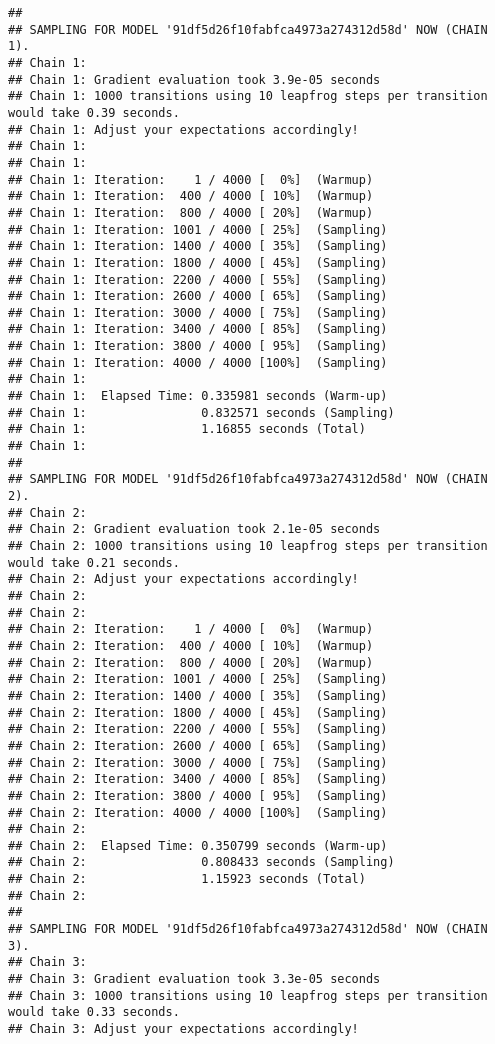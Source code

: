 \documentclass[12pt,]{article}
\begin{document}
{\begin{verbatim}
## 
## SAMPLING FOR MODEL '91df5d26f10fabfca4973a274312d58d' NOW (CHAIN 1).
## Chain 1: 
## Chain 1: Gradient evaluation took 3.9e-05 seconds
## Chain 1: 1000 transitions using 10 leapfrog steps per transition would take 0.39 seconds.
## Chain 1: Adjust your expectations accordingly!
## Chain 1: 
## Chain 1: 
## Chain 1: Iteration:    1 / 4000 [  0%]  (Warmup)
## Chain 1: Iteration:  400 / 4000 [ 10%]  (Warmup)
## Chain 1: Iteration:  800 / 4000 [ 20%]  (Warmup)
## Chain 1: Iteration: 1001 / 4000 [ 25%]  (Sampling)
## Chain 1: Iteration: 1400 / 4000 [ 35%]  (Sampling)
## Chain 1: Iteration: 1800 / 4000 [ 45%]  (Sampling)
## Chain 1: Iteration: 2200 / 4000 [ 55%]  (Sampling)
## Chain 1: Iteration: 2600 / 4000 [ 65%]  (Sampling)
## Chain 1: Iteration: 3000 / 4000 [ 75%]  (Sampling)
## Chain 1: Iteration: 3400 / 4000 [ 85%]  (Sampling)
## Chain 1: Iteration: 3800 / 4000 [ 95%]  (Sampling)
## Chain 1: Iteration: 4000 / 4000 [100%]  (Sampling)
## Chain 1: 
## Chain 1:  Elapsed Time: 0.335981 seconds (Warm-up)
## Chain 1:                0.832571 seconds (Sampling)
## Chain 1:                1.16855 seconds (Total)
## Chain 1: 
## 
## SAMPLING FOR MODEL '91df5d26f10fabfca4973a274312d58d' NOW (CHAIN 2).
## Chain 2: 
## Chain 2: Gradient evaluation took 2.1e-05 seconds
## Chain 2: 1000 transitions using 10 leapfrog steps per transition would take 0.21 seconds.
## Chain 2: Adjust your expectations accordingly!
## Chain 2: 
## Chain 2: 
## Chain 2: Iteration:    1 / 4000 [  0%]  (Warmup)
## Chain 2: Iteration:  400 / 4000 [ 10%]  (Warmup)
## Chain 2: Iteration:  800 / 4000 [ 20%]  (Warmup)
## Chain 2: Iteration: 1001 / 4000 [ 25%]  (Sampling)
## Chain 2: Iteration: 1400 / 4000 [ 35%]  (Sampling)
## Chain 2: Iteration: 1800 / 4000 [ 45%]  (Sampling)
## Chain 2: Iteration: 2200 / 4000 [ 55%]  (Sampling)
## Chain 2: Iteration: 2600 / 4000 [ 65%]  (Sampling)
## Chain 2: Iteration: 3000 / 4000 [ 75%]  (Sampling)
## Chain 2: Iteration: 3400 / 4000 [ 85%]  (Sampling)
## Chain 2: Iteration: 3800 / 4000 [ 95%]  (Sampling)
## Chain 2: Iteration: 4000 / 4000 [100%]  (Sampling)
## Chain 2: 
## Chain 2:  Elapsed Time: 0.350799 seconds (Warm-up)
## Chain 2:                0.808433 seconds (Sampling)
## Chain 2:                1.15923 seconds (Total)
## Chain 2: 
## 
## SAMPLING FOR MODEL '91df5d26f10fabfca4973a274312d58d' NOW (CHAIN 3).
## Chain 3: 
## Chain 3: Gradient evaluation took 3.3e-05 seconds
## Chain 3: 1000 transitions using 10 leapfrog steps per transition would take 0.33 seconds.
## Chain 3: Adjust your expectations accordingly!

\end{verbatim}}
\end{document}
